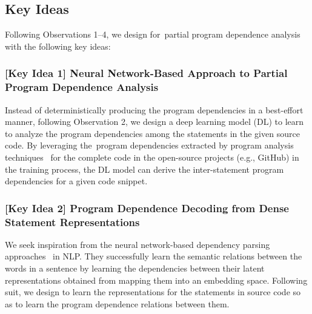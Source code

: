 \subsection{Key Ideas}
\label{key:sec}

\noindent Following Observations 1--4, we design \tool for~par\-tial
program dependence analysis with the following key ideas:

\vspace{3pt}
\subsubsection{{\bf [Key Idea 1] Neural Network-Based Approach to Partial Program Dependence Analysis}}
Instead of deterministically producing the program dependencies in a
best-effort manner, following Observation 2, we design a deep learning
model (DL) to learn to analyze the program dependencies among the
statements in the given source code. By leveraging the~pro\-gram
dependencies extracted by program analysis techniques~\cite{pdg} for
the complete code in the open-source projects (e.g., GitHub) in the
training process, the DL model can derive the inter-statement program
dependencies for a given code snippet.

\vspace{2pt}
\subsubsection{{\bf [Key Idea 2] Program Dependence Decoding from Dense Statement Representations}}
We seek inspiration from the neural network-based dependency parsing
approaches~\cite{chen-manning-2014-fast} in NLP. They successfully
learn the semantic relations between the words in a sentence by
learning the dependencies between their latent representations
obtained from mapping them into an embedding space. Following suit, we
design \tool to learn the representations for the statements in source
code so as to learn the program dependence relations between them.

\vspace{2pt}
